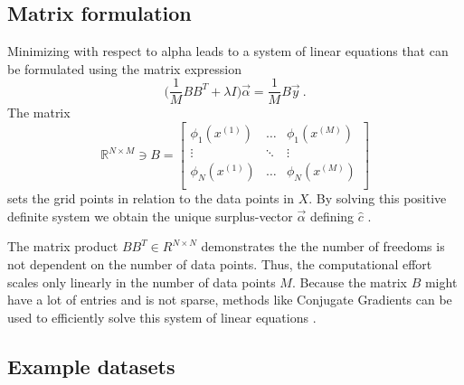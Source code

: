 \subsection{Matrix formulation}
Minimizing with respect to alpha leads to a system of linear equations that
can be formulated using the matrix expression
$$\Big(\frac{1}{M} BB^T + \lambda I \Big)\vec{\alpha} = \frac{1}{M}B\vec{y} \
.$$
The matrix
$$ \mathbb{R}^{N \times M} \ni B =
\begin{bmatrix}
  \phi_1(x^{(1)}) & \dots & \phi_1(x^{(M)}) \\
  \vdots & \ddots & \vdots \\
  \phi_N(x^{(1)}) & \dots  & \phi_N(x^{(M)}) \\
\end{bmatrix}
$$
sets the grid points in relation to the data points in $X$. By solving this
positive definite system we obtain the unique surplus-vector
$\vec{\alpha}$ defining $\hat{c}$ \cite{disshei}.
\par
The
matrix product $BB^T \in R^{N \times N}$ demonstrates the the number of freedoms
is not dependent on the number of data points. Thus, the computational effort
scales only linearly in the number of data points $M$\cite{disspfl}. Because
the matrix $B$ might have a lot of entries and is not sparse, methods like
Conjugate Gradients can be used to efficiently solve this system
of linear equations \cite{disshei}.

\subsection{Example datasets}




